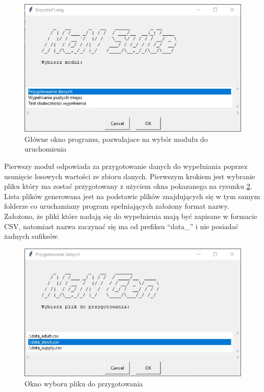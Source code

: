 \documentclass[12pt,twoside]{article}
\begin{document}
\begin{figure}[ht]
    \centering
    \includegraphics[width=12cm]{img/01.jpg}
    \caption{Główne okno programu, pozwalajace na wybór modułu do uruchomienia}
    \label{Fig:main}
\end{figure}
\FloatBarrier

Pierwszy moduł odpowiada za przygotowanie danych do wypełniania poprzez usunięcie losowych wartości ze zbioru danych.
Pierwszym krokiem jest wybranie pliku który ma zostać przygotowany
z użyciem okna pokazanego na rysunku \ref{Fig:gen_file}.
Lista plików generowana jest na podstawie plików znajdujących się
w tym samym folderze co uruchamiany program spełniających założony format nazwy.
Założono, że pliki które nadają się do wypełnienia mają być zapisane w formacie CSV,
natomiast nazwa zaczynać się ma od prefiksu ``data\_'' i nie posiadać żadnych sufiksów.

\begin{figure}[ht]
    \centering
    \includegraphics[width=12cm]{img/02.jpg}
    \caption{Okno wyboru pliku do przygotowania}
    \label{Fig:gen_file}
\end{figure}
\FloatBarrier
\end{document}
